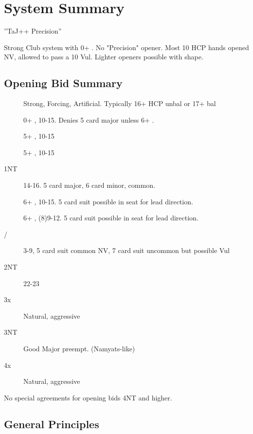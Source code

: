 \documentclass[tom-ari]{subfile}
\begin{document}
	
\chapter{System Summary}


''TaJ++ Precision'' %

Strong Club system with 0+ .  No "Precision"  opener.  Most 10 HCP hands opened NV, allowed to pass a 10 Vul. Lighter openers possible with shape.  

\section{Opening Bid Summary}

\begin{description}
	\item[] Strong, Forcing, Artificial.  Typically 16+ HCP unbal or 17+ bal
	\item[] 0+ \diamondsuit, 10-15.  Denies 5 card major unless 6+ \diamondsuit.
	\item[] 5+ \heartsuit, 10-15
	\item[] 5+ \spadesuit, 10-15
	\item[1NT] 14-16.  5 card major, 6 card minor,  common.
	\item[] 6+ \clubsuit, 10-15.  5 card suit possible in \third seat for lead direction.
	\item[] 6+ \diamondsuit, (8)9-12.  5 card suit possible in \third seat for lead direction.
	\item[/] 3-9, 5 card suit common NV, 7 card suit uncommon but possible Vul
	\item[2NT] 22-23
	\item[3x] Natural, aggressive
	\item[3NT] Good Major preempt.  (Namyats-like)
	\item[4x] Natural, aggressive
\end{description}

No special agreements for opening bids 4NT and higher.

\section{General Principles}
\end{document}
